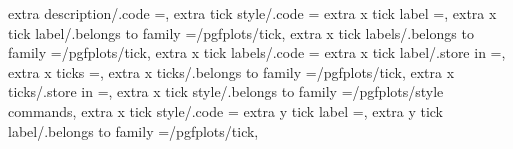 extra description/.code                                            =,                                                                                                                                  
extra tick style/.code                                             ={                                                                                                                                 
extra x tick label                                                 =,                                                                                                                                  
extra x tick label/.belongs to family                              =/pgfplots/tick,                                                                                                                    
extra x tick labels/.belongs to family                             =/pgfplots/tick,                                                                                                                    
extra x tick labels/.code                                          ={                                                                                                                                 
extra x tick label/.store in                                       =\pgfplots@extra@xticklabel,                                                                                                        
extra x ticks                                                      =,                                                                                                                                  
extra x ticks/.belongs to family                                   =/pgfplots/tick,                                                                                                                    
extra x ticks/.store in                                            =\pgfplots@extra@xtick,                                                                                                             
extra x tick style/.belongs to family                              =/pgfplots/style commands,                                                                                                          
extra x tick style/.code                                           ={                                                                                                                                 
extra y tick label                                                 =,                                                                                                                                  
extra y tick label/.belongs to family                              =/pgfplots/tick,                                                                                                                    
}}}
